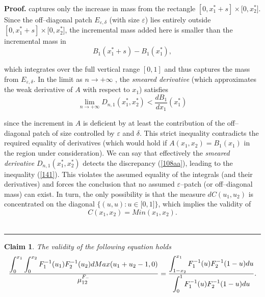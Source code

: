 \documentclass[onecolumn]{article}
\providecommand{\dint}{\displaystyle\int}
\newtheorem{claim}[theorem]{Claim}
\newenvironment{proof}[1][Proof]{\noindent\textbf{#1.} }{\ \rule{0.5em}{0.5em}}
\renewcommand{\dint}{\displaystyle\int}
\begin{document}
\begin{proof}
captures only the increase in mass from the rectangle $[0,x_{1}^{\ast
}+s]\times \lbrack 0,x_{2}^{\ast }]$. Since the off--diagonal patch $%
E_{\varepsilon ,\delta }${} (with size $\varepsilon $) lies entirely outside 
$[0,x_{1}^{\ast }+s]\times \lbrack 0,x_{2}^{\ast }]$, the incremental mass
added here is smaller than the incremental mass in%
\begin{equation}
B_{1}(x_{1}^{\ast }+s)-B_{1}(x_{1}^{\ast }),  \label{140}
\end{equation}

which integrates over the full vertical range $[0,1]$ and thus captures the
mass from $E_{\varepsilon ,\delta }.$ In the limit as $n\rightarrow +\infty $%
, the \textit{smeared derivative} (which approximates the weak derivative of 
$A$ with respect to $x_{1}$) satisfies%
\begin{equation}
\underset{n\rightarrow +\infty }{\lim }D_{n,1}(x_{1}^{\ast },x_{2}^{\ast })<%
\frac{dB_{1}}{dx_{1}}(x_{1}^{\ast })  \label{141}
\end{equation}

since the increment in $A$ is deficient by at least the contribution of the
off--diagonal patch of size controlled by $\varepsilon $ and $\delta $. This
strict inequality contradicts the required equality of derivatives (which
would hold if $A(x_{1},x_{2})=B_{1}(x_{1})$ in the region under
consideration). We can say that effectively the \textit{smeared derivative} $%
D_{n,1}(x_{1}^{\ast },x_{2}^{\ast })$ detects the discrepancy (\ref{108aa}),
leading to the inequality (\ref{141}). This violates the assumed equality of
the integrals (and their derivatives) and forces the conclusion that no
assumed $\varepsilon $--patch (or off--diagonal mass) can exist. In turn,
the only possibility is that the measure $dC(u_{1},u_{2})$ is concentrated
on the diagonal $\{(u,u):u\in \lbrack 0,1]\}$, which implies the validity of%
\begin{equation}
C(x_{1},x_{2})=Min(x_{1},x_{2}).  \label{142}
\end{equation}
\end{proof}

\begin{claim}
\label{fh-claim3} The validity of the following equation holds 
\begin{equation}
\frac{\dint\nolimits_{0}^{x_{1}}\dint%
\nolimits_{0}^{x_{2}}F_{1}^{-1}(u_{1})F_{2}^{-1}(u_{2})dMax(u_{1}+u_{2}-1,0)%
}{\mu _{12}^{F_{-}}}=\frac{\dint%
\nolimits_{1-x_{2}}^{x_{1}}F_{1}^{-1}(u)F_{2}^{-1}(1-u)du}{%
\dint\nolimits_{0}^{1}F_{1}^{-1}(u)F_{2}^{-1}(1-u)du}.  \label{35a}
\end{equation}
\end{claim}
\end{document}
